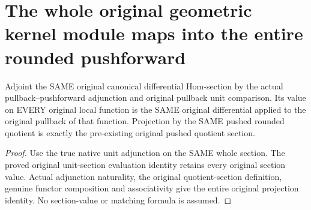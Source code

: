 \section{The whole original geometric kernel module maps into the entire rounded pushforward}
\label{sec:rounded-canonical-kernel-module-map}

\begin{definition}
\label{sc0-rounded-kernel-map:original-pushed-section}
\leanok
Adjoint the SAME original canonical differential Hom-section by
the actual pullback--pushforward adjunction and original pullback
unit comparison. Its value on EVERY original local function is
the SAME original differential applied to the original pullback
of that function. Projection by the SAME pushed rounded quotient
is exactly the pre-existing original pushed quotient section.
\end{definition}
\begin{proof}
Use the true native unit adjunction on the SAME whole section.
The proved original unit-section evaluation identity retains
every original section value. Actual adjunction naturality,
the original quotient-section definition, genuine functor
composition and associativity give the entire original projection
identity. No section-value or matching formula is assumed.
\end{proof}

